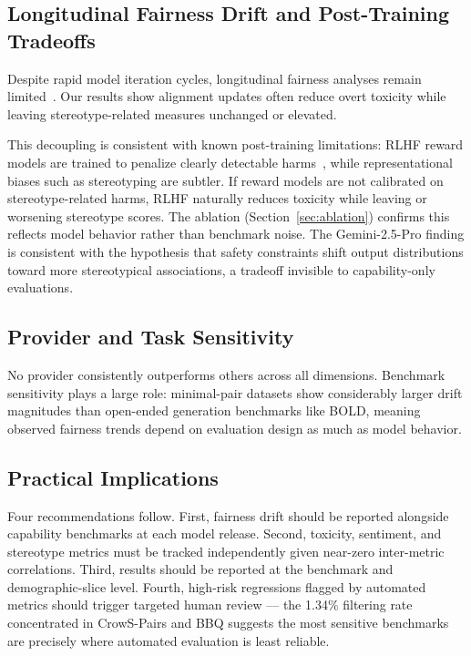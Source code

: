 \documentclass[11pt]{article}
\begin{document}
\subsection{Longitudinal Fairness Drift and Post-Training Tradeoffs}

Despite rapid model iteration cycles, longitudinal fairness analyses remain limited~\citep{mehrabi2021survey,garg2024identity}. Our results show alignment updates often reduce overt toxicity while leaving stereotype-related measures unchanged or elevated.

This decoupling is consistent with known post-training limitations: RLHF reward models are trained to penalize clearly detectable harms~\citep{ouyang2022rlhf,bai2022constitutional}, while representational biases such as stereotyping are subtler. If reward models are not calibrated on stereotype-related harms, RLHF naturally reduces toxicity while leaving or worsening stereotype scores. The ablation (Section~\ref{sec:ablation}) confirms this reflects model behavior rather than benchmark noise. The Gemini-2.5-Pro finding is consistent with the hypothesis that safety constraints shift output distributions toward more stereotypical associations, a tradeoff invisible to capability-only evaluations.

\subsection{Provider and Task Sensitivity}

No provider consistently outperforms others across all dimensions. Benchmark sensitivity plays a large role: minimal-pair datasets show considerably larger drift magnitudes than open-ended generation benchmarks like BOLD, meaning observed fairness trends depend on evaluation design as much as model behavior.

\subsection{Practical Implications}

Four recommendations follow. First, fairness drift should be reported alongside capability benchmarks at each model release. Second, toxicity, sentiment, and stereotype metrics must be tracked independently given near-zero inter-metric correlations. Third, results should be reported at the benchmark and demographic-slice level. Fourth, high-risk regressions flagged by automated metrics should trigger targeted human review --- the 1.34\% filtering rate concentrated in CrowS-Pairs and BBQ suggests the most sensitive benchmarks are precisely where automated evaluation is least reliable.
\end{document}
